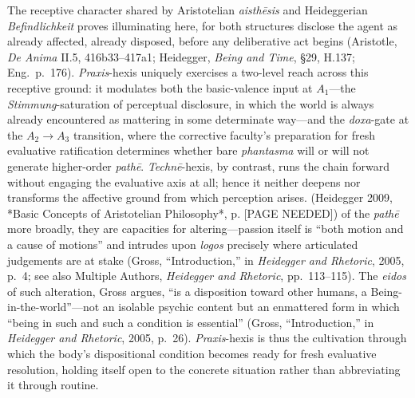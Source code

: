 \documentclass{article}
\begin{document}
The receptive character shared by Aristotelian \textit{aisth\=esis} and Heideggerian \textit{Befindlichkeit} proves illuminating here, for both structures disclose the agent as already affected, already disposed, before any deliberative act begins (Aristotle, \textit{De Anima} II.5, 416b33--417a1; Heidegger, \textit{Being and Time}, \S 29, H.137; Eng.~p.~176). \textit{Praxis}-hexis uniquely exercises a two-level reach across this receptive ground: it modulates both the basic-valence input at $A_1$---the \textit{Stimmung}-saturation of perceptual disclosure, in which the world is always already encountered as mattering in some determinate way---and the \textit{doxa}-gate at the $A_2 \rightarrow A_3$ transition, where the corrective faculty's preparation for fresh evaluative ratification determines whether bare \textit{phantasma} will or will not generate higher-order \textit{path\=e}. \textit{Techn\=e}-hexis, by contrast, runs the chain forward without engaging the evaluative axis at all; hence it neither deepens nor transforms the affective ground from which perception arises. (Heidegger 2009, *Basic Concepts of Aristotelian Philosophy*, p. [PAGE NEEDED]) of the \textit{path\=e} more broadly, they are capacities for altering---passion itself is ``both motion and a cause of motions'' and intrudes upon \textit{logos} precisely where articulated judgements are at stake (Gross, ``Introduction,'' in \textit{Heidegger and Rhetoric}, 2005, p.~4; see also Multiple Authors, \textit{Heidegger and Rhetoric}, pp.~113--115). The \textit{eidos} of such alteration, Gross argues, ``is a disposition toward other humans, a Being-in-the-world''---not an isolable psychic content but an enmattered form in which ``being in such and such a condition is essential'' (Gross, ``Introduction,'' in \textit{Heidegger and Rhetoric}, 2005, p.~26). \textit{Praxis}-hexis is thus the cultivation through which the body's dispositional condition becomes ready for fresh evaluative resolution, holding itself open to the concrete situation rather than abbreviating it through routine.
\end{document}
